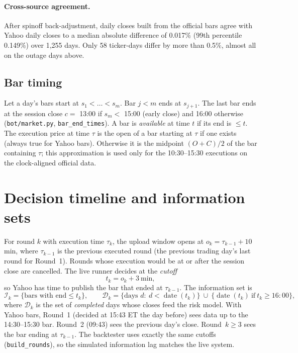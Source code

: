 \documentclass[11pt,a4paper]{article}
\newcommand{\code}[1]{\texttt{#1}}
\begin{document}
\paragraph{Cross-source agreement.} After spinoff back-adjustment, daily closes built from the official bars agree with
Yahoo daily closes to a median absolute difference of 0.017\% (99th percentile 0.149\%) over 1{,}255 days. Only 58
ticker-days differ by more than 0.5\%, almost all on the outage days above.

\subsection{Bar timing}\label{sec:bartiming}
Let a day's bars start at $s_1<\dots<s_m$. Bar $j<m$ ends at $s_{j+1}$. The last bar ends at the session close
$c=$ 13:00 if $s_m<$ 15:00 (early close) and 16:00 otherwise (\code{bot/market.py}, \code{bar\_end\_times}). A bar is
\emph{available} at time $t$ if its end is $\le t$. The execution price at time $\tau$ is the open of a bar starting at
$\tau$ if one exists (always true for Yahoo bars). Otherwise it is the midpoint $(O+C)/2$ of the bar containing $\tau$; this
approximation is used only for the 10:30--15:30 executions on the clock-aligned official data.

\section{Decision timeline and information sets}

For round $k$ with execution time $\tau_k$, the upload window opens at $o_k=\tau_{k-1}+10$ min, where $\tau_{k-1}$ is the
previous executed round (the previous trading day's last round for Round~1). Rounds whose execution would be at or after the
session close are cancelled. The live runner decides at the \emph{cutoff}
\begin{equation}
  t_k = o_k + 3\ \text{min},
\end{equation}
so Yahoo has time to publish the bar that ended at $\tau_{k-1}$. The information set is
\begin{equation}
  \mathcal I_k=\{\text{bars with end}\le t_k\}, \qquad
  \mathcal D_k=\{\text{days } d:\ d<\operatorname{date}(t_k)\}\ \cup\ \{\operatorname{date}(t_k)\ \text{if}\ t_k\ge 16{:}00\},
\end{equation}
where $\mathcal D_k$ is the set of \emph{completed} days whose closes feed the risk model. With Yahoo bars, Round~1 (decided at
15:43 ET the day before) sees data up to the 14:30--15:30 bar. Round~2 (09:43) sees the previous day's close. Round~$k\ge3$
sees the bar ending at $\tau_{k-1}$. The backtester uses exactly the same cutoffs (\code{build\_rounds}), so the simulated
information lag matches the live system.
\end{document}
